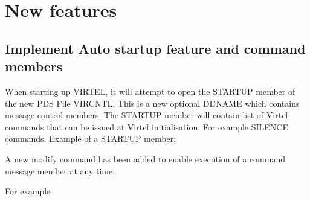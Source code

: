\documentclass[letterpaper,10pt,english]{sphinxmanual}
\begin{document}
\chapter{New features}
\label{\detokenize{TN202303:new-features}}

\section{Implement Auto startup feature and command members}
\label{\detokenize{TN202303:implement-auto-startup-feature-and-command-members}}
\sphinxAtStartPar
When starting up VIRTEL, it will attempt to open the STARTUP member of the new PDS File VIRCNTL. This is a new optional DDNAME which contains message control members. The STARTUP member will contain list of Virtel commands that can be issued at Virtel initialisation. For example SILENCE commands. Example of a STARTUP member; \sphinxhyphen{}

\begin{sphinxVerbatim}[commandchars=\\\{\}]
    
   
   
    
       
   
   
   
\end{sphinxVerbatim}

\sphinxAtStartPar
A new modify command has been added to enable execution of a command message member at any time: \sphinxhyphen{}

\begin{sphinxVerbatim}[commandchars=\\\{\}]
 
\end{sphinxVerbatim}

\sphinxAtStartPar
For example
\end{document}
